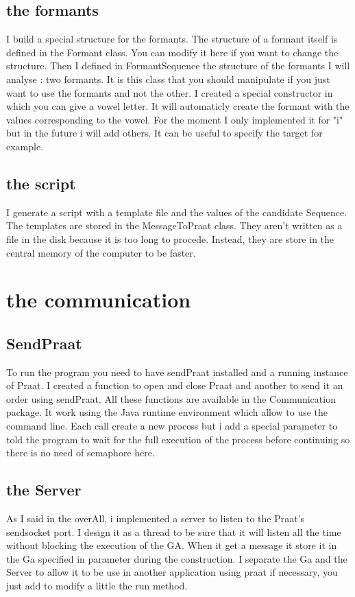 \documentclass[12pt]{report}
\begin{document}
\subsection{the formants}
I build a special structure for the formants. The structure of a formant itself is defined in the Formant class. You can modify it here if you want to change the structure. Then I defined in FormantSequence the structure of the formants I will analyse : two formants. It is this class that you should manipulate if you just want to use the formants and not the other. I created a special constructor in which you can give a vowel letter. It will automaticly create the formant with the values corresponding to the vowel. For the moment I only implemented it for "i" but in the future i will add others. It can be useful to specify the target for example.

\subsection{the script}
I generate a script with a template file and the values of the candidate Sequence. The templates are stored in the MessageToPraat class. They aren't written as a file in the disk because it is too long to procede. Instead, they are store in the central memory of the computer to be faster.

\section{the communication}
\subsection{SendPraat}
To run the program you need to have sendPraat installed and a running instance of Praat.
I created a function to open and close Praat and another to send it an order using sendPraat. All these functions are available in the Communication package. It work using the Java runtime environment which allow to use the command line. Each call create a new process but i add a special parameter to told the program to wait for the full execution of the process before continuing so there is no need of semaphore here.

\subsection{the Server}
As I said in the overAll, i implemented a server to listen to the Praat's sendsocket port.
I design it as a thread to be sure that it will listen all the time without blocking the execution of the GA. When it get a message it store it in the Ga specified in parameter during the construction. I separate
the Ga and the Server to allow it to be use in another application using praat if necessary, you just add to modify a little the run method. 
\end{document}
